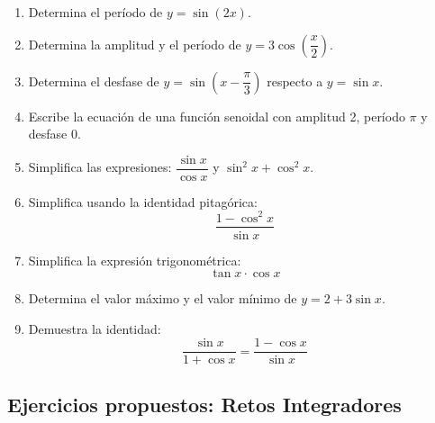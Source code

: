 \documentclass[12pt, letterpaper]{article}
\begin{document}
\begin{enumerate}[resume=ejercicios, leftmargin=*]
  \item \facil{} Determina el período de $y = \sin(2x)$.

  \item \facil{} Determina la amplitud y el período de $y = 3\cos\left(\dfrac{x}{2}\right)$.

  \item \medio{} Determina el desfase de $y = \sin\left(x - \dfrac{\pi}{3}\right)$ respecto a $y = \sin x$.

  \item \medio{} Escribe la ecuación de una función senoidal con amplitud 2, período $\pi$ y desfase 0.

  \item \medio{} Simplifica las expresiones: $\dfrac{\sin x}{\cos x}$ \quad y \quad $\sin^2 x + \cos^2 x$.

  \item \dificil{} Simplifica usando la identidad pitagórica:
        $$\frac{1 - \cos^2 x}{\sin x}$$

  \item \dificil{} Simplifica la expresión trigonométrica:
        $$\tan x \cdot \cos x$$

  \item \dificil{} Determina el valor máximo y el valor mínimo de $y = 2 + 3\sin x$.

  \item \muyDificil{} Demuestra la identidad:
        $$\frac{\sin x}{1 + \cos x} = \frac{1 - \cos x}{\sin x}$$
\end{enumerate}

\subsection{Ejercicios propuestos: Retos Integradores}
\end{document}
